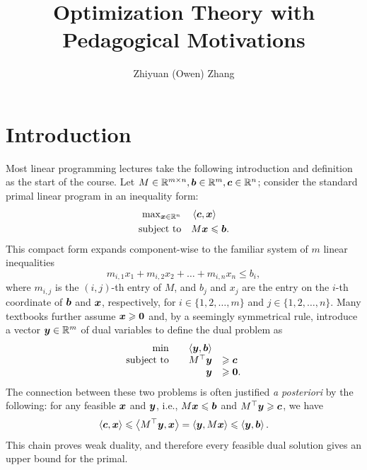 \documentclass[12pt]{report}
\begin{document}
\title{Optimization Theory with Pedagogical Motivations}
\author{Zhiyuan (Owen) Zhang}
\tableofcontents
\newpage

\chapter{Introduction}

Most linear programming lectures take the following introduction and definition as the start of the course. Let $M\in\mathbb R^{m\times n}, {\boldsymbol b}\in\mathbb R^m, {\boldsymbol c}\in\mathbb R^n$; consider the standard primal linear program in an inequality form: 
\begin{equation*}
\begin{split}
    \mathrm{max}_{{\boldsymbol x}\in\mathbb R^n}  \quad & \left\langle\boldsymbol c, \boldsymbol x\right\rangle\\
    \text{subject to} \quad & M \boldsymbol x \leqslant \boldsymbol b. \\ 
\end{split}
\end{equation*}
This compact form expands component-wise to the familiar system of $m$ linear inequalities 
\[ m_{i, 1} x_1 + m_{i, 2} x_2 + \dots + m_{i, n} x_n \leq b_i, \] 
where $m_{i, j}$ is the $(i, j)$-th entry of $M$, and $b_j$ and $x_j$ are the entry on the $i$-th coordinate of ${\boldsymbol b}$ and ${\boldsymbol x}$, respectively, for $i \in \{1, 2, \dots, m\}$ and $j \in \{1, 2, \dots, n\}$. Many textbooks further assume ${\boldsymbol x}\geqslant\boldsymbol0$ and, by a seemingly symmetrical rule, introduce a vector ${\boldsymbol y}\in \mathbb R^m$ of dual variables to define the dual problem as 
\begin{equation*}
\begin{array}{rrl}
\mathrm{min}  \quad & \left\langle\boldsymbol y, \boldsymbol b\right\rangle\\
    \text{subject to} \quad & M^\top {\boldsymbol y} & \geqslant \boldsymbol c \\ 
    & {\boldsymbol y} & \geqslant \boldsymbol0.
\end{array}
\end{equation*}
The connection between these two problems is often justified {\em a posteriori} by the following: for any feasible ${\boldsymbol x}$ and ${\boldsymbol y}$, i.e., $M\boldsymbol x\leqslant {\boldsymbol b}$ and $M^\top\boldsymbol y\geqslant {\boldsymbol c}$, we have
\[ \left\langle{\boldsymbol c}, {\boldsymbol x}\right\rangle \leqslant \left\langle M^\top{\boldsymbol y}, {\boldsymbol x}\right\rangle = \left\langle{\boldsymbol y}, M{\boldsymbol x}\right\rangle\leqslant \left\langle{\boldsymbol y}, {\boldsymbol b}\right\rangle.\]
This chain proves weak duality, and therefore every feasible dual solution gives an upper bound for the primal.
\end{document}
